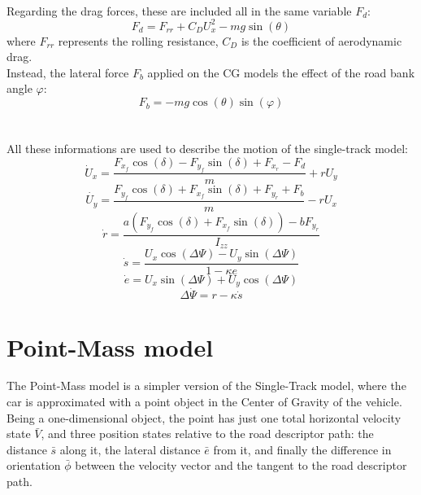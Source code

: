 \documentclass[a4paper, onecolumn, 11pt, twoside]{article}
\begin{document}
\\
Regarding the drag forces, these are included all in the same variable $F_d$:
\begin{equation}
    \label{drag_force}
    F_d = F_{rr}+C_DU_x^2-mg\sin(\theta)
\end{equation}
where $F_{rr}$ represents the rolling resistance, $C_D$ is the coefficient of aerodynamic
drag. \\
Instead, the lateral force $F_b$ applied on the CG models the effect of the road bank angle $\varphi$:
\begin{equation}
    \label{lateral_force}
    F_b = -mg\cos(\theta)\sin(\varphi)
\end{equation}
\\
\\
All these informations are used to describe the motion of the single-track model:
\begin{equation}
    \dot{U}_x = \frac{F_{x_f}\cos(\delta)-F_{y_f}\sin(\delta)+F_{x_r}-F_d}{m}+rU_y
\end{equation}
\begin{equation}
    \dot{U_y} = \frac{F_{y_f}\cos(\delta)+F_{x_f}\sin(\delta)+F_{y_r}+F_b}{m}-rU_x 
\end{equation}
\begin{equation}
    \dot{r} = \frac{a(F_{y_f}\cos(\delta)+F_{x_f}\sin(\delta))-bF_{y_r}}{I_{zz}}
\end{equation}
\begin{equation}
    \dot{s} = \frac{U_x\cos(\Delta \varPsi) -U_y\sin(\Delta \varPsi)}{1-\kappa e}
\end{equation}
\begin{equation}
    \dot{e} = U_x\sin(\Delta \varPsi)+U_y \cos(\Delta \varPsi)
\end{equation}
\begin{equation}
    \Delta \dot{\varPsi} = r-\kappa \dot{s}
\end{equation}




\section*{Point-Mass model}
The Point-Mass model is a simpler version of the Single-Track model, where the car is approximated with a point object
in the Center of Gravity of the vehicle. Being a one-dimensional object, the point has just one total horizontal velocity state $\bar{V}$, 
and three position states relative to the road descriptor path: the distance $\bar{s}$ along it, the lateral distance $\bar{e}$ from it, and finally the
difference in orientation $\bar{\phi}$ between the velocity vector and the tangent to the road descriptor path.
\end{document}
